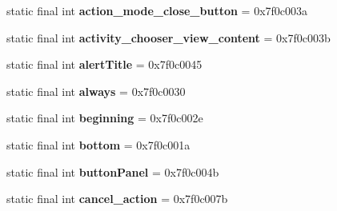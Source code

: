 \begin{DoxyCompactItemize}
\item 
\hypertarget{classandroid_1_1support_1_1design_1_1_r_1_1id_af2b02b09f506afe0d25e461b80153398}{}static final int {\bfseries action\+\_\+mode\+\_\+close\+\_\+button} = 0x7f0c003a\label{classandroid_1_1support_1_1design_1_1_r_1_1id_af2b02b09f506afe0d25e461b80153398}

\item 
\hypertarget{classandroid_1_1support_1_1design_1_1_r_1_1id_afee6612fa57475decd6b62b7f85daac8}{}static final int {\bfseries activity\+\_\+chooser\+\_\+view\+\_\+content} = 0x7f0c003b\label{classandroid_1_1support_1_1design_1_1_r_1_1id_afee6612fa57475decd6b62b7f85daac8}

\item 
\hypertarget{classandroid_1_1support_1_1design_1_1_r_1_1id_a4be5c3c6c6f023b785dcf8acc2414549}{}static final int {\bfseries alert\+Title} = 0x7f0c0045\label{classandroid_1_1support_1_1design_1_1_r_1_1id_a4be5c3c6c6f023b785dcf8acc2414549}

\item 
\hypertarget{classandroid_1_1support_1_1design_1_1_r_1_1id_a769c5163585904ccd77e69126c43db5f}{}static final int {\bfseries always} = 0x7f0c0030\label{classandroid_1_1support_1_1design_1_1_r_1_1id_a769c5163585904ccd77e69126c43db5f}

\item 
\hypertarget{classandroid_1_1support_1_1design_1_1_r_1_1id_ac7ba6b064bb3fb94fe97c0481ba5105b}{}static final int {\bfseries beginning} = 0x7f0c002e\label{classandroid_1_1support_1_1design_1_1_r_1_1id_ac7ba6b064bb3fb94fe97c0481ba5105b}

\item 
\hypertarget{classandroid_1_1support_1_1design_1_1_r_1_1id_a79e61e6085c198377d3f88b7fd07fd77}{}static final int {\bfseries bottom} = 0x7f0c001a\label{classandroid_1_1support_1_1design_1_1_r_1_1id_a79e61e6085c198377d3f88b7fd07fd77}

\item 
\hypertarget{classandroid_1_1support_1_1design_1_1_r_1_1id_acf364991cf5b4d5eab5726ffc663b9fe}{}static final int {\bfseries button\+Panel} = 0x7f0c004b\label{classandroid_1_1support_1_1design_1_1_r_1_1id_acf364991cf5b4d5eab5726ffc663b9fe}

\item 
\hypertarget{classandroid_1_1support_1_1design_1_1_r_1_1id_a846a5d8adf38692244186015845064be}{}static final int {\bfseries cancel\+\_\+action} = 0x7f0c007b\label{classandroid_1_1support_1_1design_1_1_r_1_1id_a846a5d8adf38692244186015845064be}


\end{DoxyCompactItemize}
